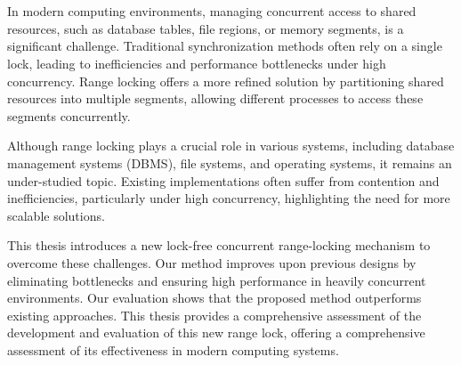 \chapter{\abstractname}

In modern computing environments, managing concurrent access to shared resources, such as database tables, file regions, or memory segments, is a significant challenge. 
Traditional synchronization methods often rely on a single lock, leading to inefficiencies and performance bottlenecks under high concurrency. 
Range locking offers a more refined solution by partitioning shared resources into multiple segments, allowing different processes to access these segments concurrently. 

Although range locking plays a crucial role in various systems, including database management systems (DBMS), file systems, and operating systems, it remains an under-studied topic. 
Existing implementations often suffer from contention and inefficiencies, particularly under high concurrency, highlighting the need for more scalable solutions.

This thesis introduces a new lock-free concurrent range-locking mechanism to overcome these challenges.
Our method improves upon previous designs by eliminating bottlenecks and ensuring high performance in heavily concurrent environments.
Our evaluation shows that the proposed method outperforms existing approaches. 
This thesis provides a comprehensive assessment of the development and evaluation of this new range lock, offering a comprehensive assessment of its effectiveness in modern computing systems.
